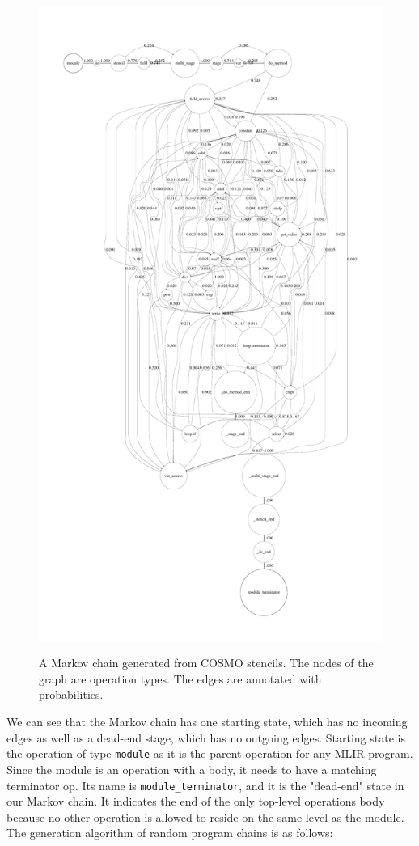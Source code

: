 \documentclass[sigplan,\review anonymous]{acmart}
\begin{document}
\begin{figure}
  \caption{A Markov chain generated from COSMO stencils. The nodes of the graph
  are operation types. The edges are annotated with probabilities.}
  \centering
  \includegraphics[width=0.9\columnwidth]{images/markov_chain.pdf}
  \label{fig:markov_cosmo}
\end{figure}

We can see that the Markov chain has one starting state, which has no incoming
edges as well as a dead-end stage, which has no outgoing edges. Starting state
is the operation of type \texttt{module} as it is the parent operation for any
MLIR program. Since the module is an operation with a body, it needs to have a
matching terminator op. Its name is \texttt{module\_terminator}, and it is the
"dead-end" state in our Markov chain. It indicates the end of the only
top-level operations body because no other operation is allowed to reside on
the same level as the module. The generation algorithm of random program chains
is as follows:\\
\end{document}
